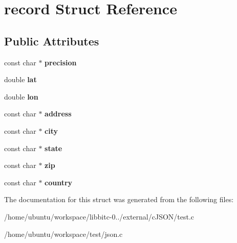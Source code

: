 \hypertarget{structrecord}{\section{record Struct Reference}
\label{structrecord}
}
\subsection*{Public Attributes}
\begin{DoxyCompactItemize}
\item 
\hypertarget{structrecord_ae129139107307462238767737f2b11d9}{const char $\ast$ {\bfseries precision}}\label{structrecord_ae129139107307462238767737f2b11d9}

\item 
\hypertarget{structrecord_aead5d6a207526cb625d716c030fa3d4d}{double {\bfseries lat}}\label{structrecord_aead5d6a207526cb625d716c030fa3d4d}

\item 
\hypertarget{structrecord_a36c8c25419ba59e1288560da3dd6bfd0}{double {\bfseries lon}}\label{structrecord_a36c8c25419ba59e1288560da3dd6bfd0}

\item 
\hypertarget{structrecord_aeb09101aea6d5fc3fe3ee56e25879836}{const char $\ast$ {\bfseries address}}\label{structrecord_aeb09101aea6d5fc3fe3ee56e25879836}

\item 
\hypertarget{structrecord_af25451922088266711d43785f1333143}{const char $\ast$ {\bfseries city}}\label{structrecord_af25451922088266711d43785f1333143}

\item 
\hypertarget{structrecord_a478c94952e0d0f9a754280f5d9d061b2}{const char $\ast$ {\bfseries state}}\label{structrecord_a478c94952e0d0f9a754280f5d9d061b2}

\item 
\hypertarget{structrecord_a27b2a2e28e6abc7cc632a059008bc438}{const char $\ast$ {\bfseries zip}}\label{structrecord_a27b2a2e28e6abc7cc632a059008bc438}

\item 
\hypertarget{structrecord_a16db8596f4402c1d21688276e5c79bfe}{const char $\ast$ {\bfseries country}}\label{structrecord_a16db8596f4402c1d21688276e5c79bfe}

\end{DoxyCompactItemize}


The documentation for this struct was generated from the following files\-:\begin{DoxyCompactItemize}
\item 
/home/ubuntu/workspace/libbitc-\/0../external/c\-J\-S\-O\-N/test.\-c\item 
/home/ubuntu/workspace/test/json.\-c\end{DoxyCompactItemize}
